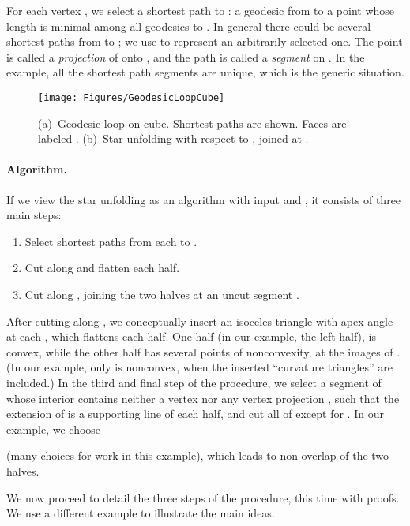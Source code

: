 \pdfoutput=1  \documentclass[]{article}
\newcommand{\figlab}[1]{\label{fig:#1}}
\newcommand{\squeezelist}{\setlength{\itemsep}{0pt}}
\begin{document}
For each vertex , we select a shortest path
 to : a geodesic from  to a point 
whose length is minimal among all geodesics to .
In general there could be several shortest paths from  to ;
we use  to represent an arbitrarily selected one.
The point  is called
a \emph{projection} of  onto ,
and the path  is called a \emph{segment} on .
In the example, all the shortest path segments  are unique,
which is the generic situation.

\begin{figure}[htbp]
\centering
\texttt{[image: Figures/GeodesicLoopCube]}
\caption{
(a)~Geodesic loop  on cube.
Shortest paths  are shown.  Faces are labeled
.
(b)~Star unfolding with respect to ,
joined at 
.
}
\figlab{GeodesicLoopCube}
\end{figure}



\paragraph{Algorithm.}
If we view the star unfolding as an algorithm
with input  and , it consists of three
main steps:
\begin{enumerate}
\squeezelist
\item Select shortest paths  from each  to .
\item Cut along  and flatten each half.
\item Cut along , joining the two halves at an uncut segment .
\end{enumerate}

After cutting along , we conceptually insert an isoceles
triangle with apex angle  at each , which flattens
each half.  One half (in our example, the left half), is convex,
while the other half has several points of nonconvexity,
at the images of .
(In our example, only  is nonconvex, when the inserted
``curvature triangles'' are included.)
In the third and final step of the procedure,
we select a segment  of  whose interior contains
neither a vertex  nor any vertex projection , 
such that the extension of  is a supporting line of each half,
and cut all of  except for .
In our example, we choose 

(many choices for  work in this example),
which leads to non-overlap of the two halves.


We now proceed to detail the three steps of the procedure,
this time with proofs.  We use a different example
to illustrate the main ideas.
\end{document}
